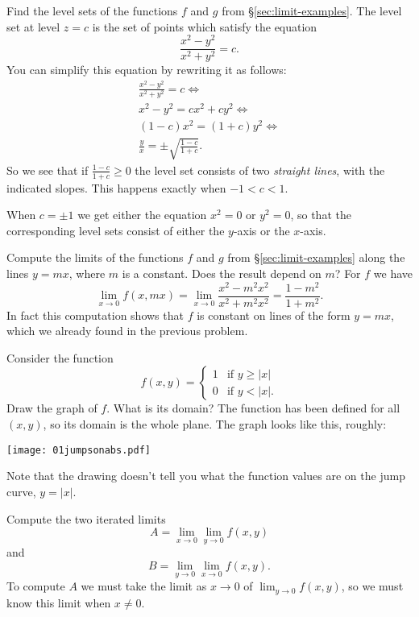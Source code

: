\begin{multicols}{2}\problemfont

\problem Find the level sets of the functions $f$ and $g$ from
\S\ref{sec:limit-examples}.
\answer
The level set at level $z=c$ is the set of points which satisfy
the equation
\[
\frac{x^2-y^2} {x^2+y^2} = c.
\]
You can simplify this equation by rewriting it as follows:
\begin{multline*}
  \frac{x^2-y^2} {x^2+y^2} = c \iff\\
  x^2-y^2 = cx^2+cy^2 \iff\\
  (1-c)x^2 = (1+c)y^2 \iff\\
  \frac{y} {x} = \pm\sqrt{\frac{1-c} {1+c}}.
\end{multline*}
So we see that if $\frac{1-c} {1+c}\geq0$ the level set
consists of two \emph{straight lines}, with the indicated slopes.
This happens exactly when $-1<c<1$.

When $c=\pm1$ we get either the equation $x^2=0$ or $y^2=0$, so
that the corresponding level sets consist of either the $y$-axis
or the $x$-axis.
\endanswer


\problem  Compute the limits of the functions $f$ and $g$ from
\S\ref{sec:limit-examples} along the lines $y=mx$, where $m$ is a
constant. Does the result depend on $m$?
\answer
For $f$ we have
\[
\lim_{x\to0}f(x, mx) = \lim_{x\to 0}\frac{x^2-m^2x^2} {x^2+m^2x^2}
=\frac{1-m^2} {1+m^2}.
\]
In fact this computation shows that $f$ is constant on lines
of the form $y=mx$, which we already found in the previous problem.
\endanswer


\problem
\label{prb:stepfunction}
Consider the function 
\[
f(x, y) = 
\begin{cases}
  1 & \text{if $y\geq |x|$} \\
  0 & \text{if $y<|x|$}.
\end{cases}
\]
\subprob Draw the graph of $f$.  What is its domain?
\answer
The function has been defined for all $(x,y)$, so
its domain is the whole plane.  The graph looks like this, roughly:

\begin{center}
    \texttt{[image: 01jumpsonabs.pdf]}
\end{center}

Note that the drawing doesn't tell you what the function values
are on the jump curve, $y=|x|$.
\endanswer


\subprob Compute the two iterated limits 
\[
A=\lim_{x\to0}\lim_{y\to0} f(x, y)
\]
and
\[
B=\lim_{y\to0}\lim_{x\to0} f(x, y).
\]
\answer
To compute $A$ we must take the limit as $x\to 0$ of $\lim_{y\to 0}f(x, y)$,
so we must know this limit when $x\neq 0$.


\end{multicols}
